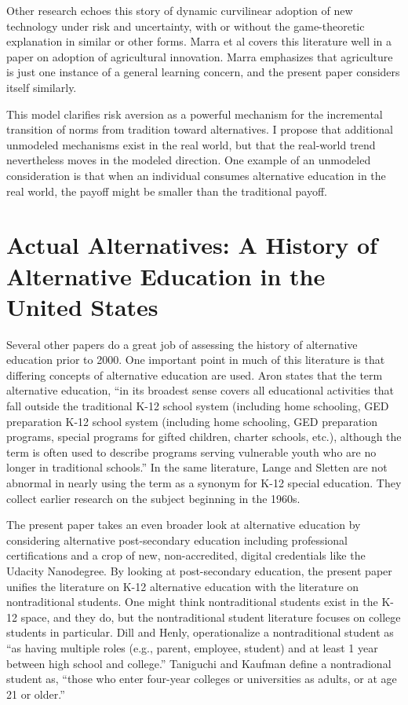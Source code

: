 \documentclass[AER]{/Users/zyl357/Documents/GitHub/research-dissertation-case-for-alt-ed/papers/alt-ed-survey/aea-latex-templates/AEA}
\begin{document}
Other research echoes this story of dynamic curvilinear adoption of new
technology under risk and uncertainty, with or without the game-theoretic
explanation in similar or other forms. Marra et al covers this literature
well in a paper on adoption of agricultural innovation\cite{marra2003economics}. Marra emphasizes
that agriculture is just one instance of a general learning concern, and
the present paper considers itself similarly.

This model clarifies risk aversion as a powerful mechanism for the
incremental transition of norms from tradition toward alternatives. I
propose that additional unmodeled mechanisms exist in the real world, but
that the real-world trend nevertheless moves in the modeled direction. One
example of an unmodeled consideration is that when an individual consumes
alternative education in the real world, the payoff might be smaller than
the traditional payoff.

\section{Actual Alternatives: A History of Alternative Education in
the United States}

Several other papers do a great job of assessing the history of
alternative education prior to 2000. One important point in much of this
literature is that differing concepts of alternative education are used.
Aron\cite{aron2006overview} states that the term alternative education, “in its broadest sense
covers all educational activities that fall outside the traditional K-12
school system (including home schooling, GED preparation K-12 school
system (including home schooling, GED preparation programs, special
programs for gifted children, charter schools, etc.), although the term is
often used to describe programs serving vulnerable youth who are no longer
in traditional schools.” In the same literature, Lange and Sletten are not
abnormal in nearly using the term as a synonym for K-12 special education.
They collect earlier research on the subject beginning in the 1960s\cite{lange2002alternative}.

The present paper takes an even broader look at alternative education by
considering alternative post-secondary education including professional
certifications and a crop of new, non-accredited, digital credentials like
the Udacity Nanodegree. By looking at post-secondary education, the
present paper unifies the literature on K-12 alternative education with
the literature on nontraditional students. One might think nontraditional
students exist in the K-12 space, and they do, but the nontraditional
student literature focuses on college students in particular. Dill and
Henly\cite{dill1998stressors}, operationalize a nontraditional student as “as having multiple
roles (e.g., parent, employee, student) and at least 1 year between high
school and college.” Taniguchi and Kaufman\cite{taniguchi2005degree} define a nontradional student
as, “those who enter four-year colleges or universities as adults, or at
age 21 or older.”
\end{document}
